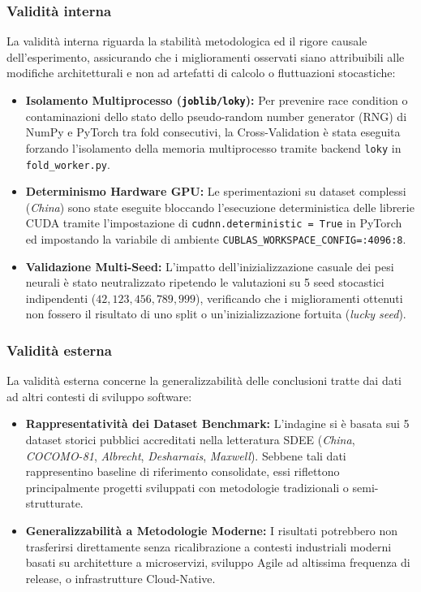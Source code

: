 \documentclass[11pt, a4paper]{article}
\begin{document}
\subsubsection{Validità interna}
La validità interna riguarda la stabilità metodologica ed il rigore causale dell'esperimento, assicurando che i miglioramenti osservati siano attribuibili alle modifiche architetturali e non ad artefatti di calcolo o fluttuazioni stocastiche:
\begin{itemize}
    \item \textbf{Isolamento Multiprocesso (\texttt{joblib/loky}):} Per prevenire race condition o contaminazioni dello stato dello pseudo-random number generator (RNG) di NumPy e PyTorch tra fold consecutivi, la Cross-Validation è stata eseguita forzando l'isolamento della memoria multiprocesso tramite backend \texttt{loky} in \texttt{fold\_worker.py}.
    \item \textbf{Determinismo Hardware GPU:} Le sperimentazioni su dataset complessi (\textit{China}) sono state eseguite bloccando l'esecuzione deterministica delle librerie CUDA tramite l'impostazione di \texttt{cudnn.deterministic = True} in PyTorch ed impostando la variabile di ambiente \texttt{CUBLAS\_WORKSPACE\_CONFIG=:4096:8}.
    \item \textbf{Validazione Multi-Seed:} L'impatto dell'inizializzazione casuale dei pesi neurali è stato neutralizzato ripetendo le valutazioni su 5 seed stocastici indipendenti ($42, 123, 456, 789, 999$), verificando che i miglioramenti ottenuti non fossero il risultato di uno split o un'inizializzazione fortuita (\textit{lucky seed}).
\end{itemize}

\subsubsection{Validità esterna}
La validità esterna concerne la generalizzabilità delle conclusioni tratte dai dati ad altri contesti di sviluppo software:
\begin{itemize}
    \item \textbf{Rappresentatività dei Dataset Benchmark:} L'indagine si è basata sui 5 dataset storici pubblici accreditati nella letteratura SDEE (\textit{China}, \textit{COCOMO-81}, \textit{Albrecht}, \textit{Desharnais}, \textit{Maxwell}). Sebbene tali dati rappresentino baseline di riferimento consolidate, essi riflettono principalmente progetti sviluppati con metodologie tradizionali o semi-strutturate.
    \item \textbf{Generalizzabilità a Metodologie Moderne:} I risultati potrebbero non trasferirsi direttamente senza ricalibrazione a contesti industriali moderni basati su architetture a microservizi, sviluppo Agile ad altissima frequenza di release, o infrastrutture Cloud-Native.
\end{itemize}
\end{document}
